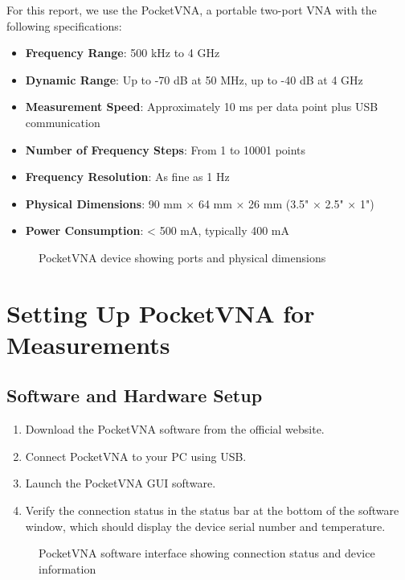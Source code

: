 \documentclass[12pt,a4paper]{article}
\begin{document}
For this report, we use the PocketVNA, a portable two-port VNA with the following specifications:

\begin{itemize}
    \item \textbf{Frequency Range}: 500 kHz to 4 GHz
    \item \textbf{Dynamic Range}: Up to -70 dB at 50 MHz, up to -40 dB at 4 GHz
    \item \textbf{Measurement Speed}: Approximately 10 ms per data point plus USB communication
    \item \textbf{Number of Frequency Steps}: From 1 to 10001 points
    \item \textbf{Frequency Resolution}: As fine as 1 Hz
    \item \textbf{Physical Dimensions}: 90 mm × 64 mm × 26 mm (3.5" × 2.5" × 1")
    \item \textbf{Power Consumption}: < 500 mA, typically 400 mA
\end{itemize}

\begin{figure}[H]
    \centering
    \caption{PocketVNA device showing ports and physical dimensions}
    \label{fig:pocket_vna}
\end{figure}

\section{Setting Up PocketVNA for Measurements}

\subsection{Software and Hardware Setup}

\begin{enumerate}
    \item Download the PocketVNA software from the official website.
    \item Connect PocketVNA to your PC using USB.
    \item Launch the PocketVNA GUI software.
    \item Verify the connection status in the status bar at the bottom of the software window, which should display the device serial number and temperature.
\end{enumerate}

\begin{figure}[H]
    \centering
    \caption{PocketVNA software interface showing connection status and device information}
    \label{fig:conn_status}
\end{figure}
\end{document}
